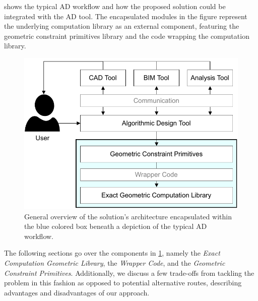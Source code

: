  shows the typical \ac{AD} workflow and how the proposed
solution could be integrated with the \ac{AD} tool.  The encapsulated modules in
the figure represent the underlying computation library as an external
component, featuring the geometric constraint primitives library and the code
wrapping the computation library.

\begin{figure}[htb]
  \includegraphics[width=\textwidth]{fig/solution-arch}
  \caption[Solution architecture within AD workflow]{
    General overview of the solution's architecture encapsulated within the
    blue colored box beneath a depiction of the typical \ac{AD} workflow.}%
  \label{fig:solution.arch}
\end{figure}

The following sections go over the components in \cref{fig:solution.arch},
namely the \textit{Exact Computation Geometric Library}, the \textit{Wrapper
Code}, and the \textit{Geometric Constraint Primitives}.  Additionally, we
discuss a few trade-offs from tackling the problem in this fashion as opposed to
potential alternative routes, describing advantages and disadvantages of our
approach.




